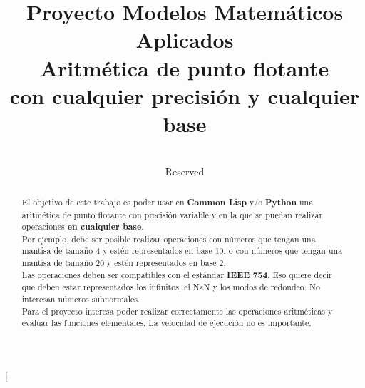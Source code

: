 \documentclass[a4paper,10pt,twocolumn]{article}
\title{Proyecto Modelos Matemáticos Aplicados \\
	Aritmética de punto flotante \\
	con cualquier precisión y cualquier base}
\author{\\ Reserved \\}
\begin{document}
	
	\twocolumn[
	
	\maketitle
	
	
	\begin{abstract}
		
		El objetivo de este trabajo es poder usar en \textbf{Common Lisp} y/o \textbf{Python} una aritmética de punto flotante con precisión variable y en la que se puedan realizar operaciones \textbf{en cualquier base}. \\
		
		Por ejemplo, debe ser posible realizar operaciones con números que tengan una mantisa de tamaño 4 y estén representados en base 10, o con números que tengan una mantisa de tamaño 20 y estén representados en base 2.\\
		
		Las operaciones deben ser compatibles con el estándar \textbf{IEEE 754}. Eso quiere decir que deben estar representados los infinitos, el NaN y los modos de redondeo. No interesan números subnormales. \\
		
		Para el proyecto interesa poder realizar correctamente las operaciones aritméticas y evaluar las funciones elementales. La velocidad de ejecución no es importante.\\
		
	\end{abstract}
	
	\vspace{0.5cm}
	
\end{document}
